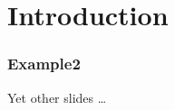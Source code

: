 \documentclass[../presentation.tex]{subfiles} %
\begin{document}
\section{Introduction} %

\begin{frame}

	\frametitle{Example2}

    Yet other slides \dots

\end{frame}
\end{document}
